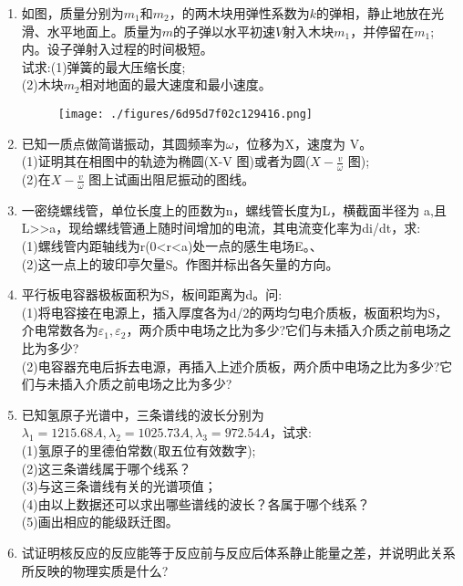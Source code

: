 
\begin{enumerate}
\item 如图，质量分别为$m_1$和$m_2$，的两木块用弹性系数为$k$的弹相，静止地放在光滑、水平地面上。质量为$m$的子弹以水平初速$V$射入木块$m_1$，并停留在$m_1$;内。设子弹射入过程的时间极短。\\
试求:(1)弹簧的最大压缩长度;\\
(2)木块$m_2$相对地面的最大速度和最小速度。
\begin{figure}[ht]
\centering
\texttt{[image: ./figures/6d95d7f02c129416.png]}
\caption{} \label{fig_SSD02_1}
\end{figure}
\item  已知一质点做简谐振动，其圆频率为$\omega$，位移为X，速度为 V。\\
(1)证明其在相图中的轨迹为椭圆(X-V 图)或者为圆($\displaystyle X-\frac{v}{\omega}$ 图);\\
(2)在$\displaystyle X-\frac{v}{\omega}$ 图上试画出阻尼振动的图线。
\item 一密绕螺线管，单位长度上的匝数为n，螺线管长度为L，横截面半径为 a,且L>>a，现给螺线管通上随时间增加的电流，其电流变化率为di/dt，求:\\
(1)螺线管内距轴线为r(0<r<a)处一点的感生电场E。、\\
(2)这一点上的玻印亭欠量S。作图并标出各矢量的方向。
\item 平行板电容器极板面积为S，板间距离为d。问:\\
(1)将电容接在电源上，插入厚度各为d/2的两均匀电介质板，板面积均为S，介电常数各为$\varepsilon_1,\varepsilon_2$，两介质中电场之比为多少?它们与未插入介质之前电场之比为多少?\\
(2)电容器充电后拆去电源，再插入上述介质板，两介质中电场之比为多少?它们与未插入介质之前电场之比为多少?
\item 已知氢原子光谱中，三条谱线的波长分别为$\lambda_1=1215.68A,\lambda_2=1025.73A,\lambda_3=972.54A$，试求:\\
(1)氢原子的里德伯常数(取五位有效数字);\\
(2)这三条谱线属于哪个线系？\\
(3)与这三条谱线有关的光谱项值；\\
(4)由以上数据还可以求出哪些谱线的波长？各属于哪个线系？\\
(5)画出相应的能级跃迁图。
\item 试证明核反应的反应能等于反应前与反应后体系静止能量之差，并说明此关系所反映的物理实质是什么?
\end{enumerate}